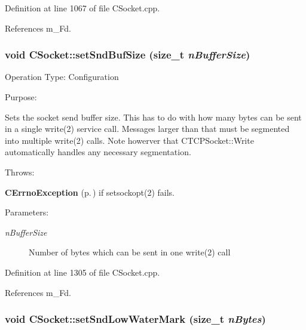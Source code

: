 Definition at line 1067 of file CSocket.cpp.

References m\_\-Fd.
\subsubsection{\setlength{\rightskip}{0pt plus 5cm}void CSocket::set\-Snd\-Buf\-Size (size\_\-t {\em n\-Buffer\-Size})}\label{classCSocket_a28}


Operation Type: Configuration

Purpose:

Sets the socket send buffer size. This  has to do with how many bytes can be  sent in a single write(2) service call. Messages larger than that must be segmented into multiple write(2) calls. Note howerver that  CTCPSocket::Write automatically handles any necessary segmentation.

Throws:\begin{CompactItemize}
\item 
{\bf CErrno\-Exception} {\rm (p.\,\pageref{classCErrnoException})} if setsockopt(2) fails.\end{CompactItemize}
\begin{Desc}
\item[Parameters: ]\par
\begin{description}
\item[{\em 
n\-Buffer\-Size}]Number of bytes which can be sent in one write(2) call \end{description}
\end{Desc}


Definition at line 1305 of file CSocket.cpp.

References m\_\-Fd.
\subsubsection{\setlength{\rightskip}{0pt plus 5cm}void CSocket::set\-Snd\-Low\-Water\-Mark (size\_\-t {\em n\-Bytes})}\label{classCSocket_a18}


